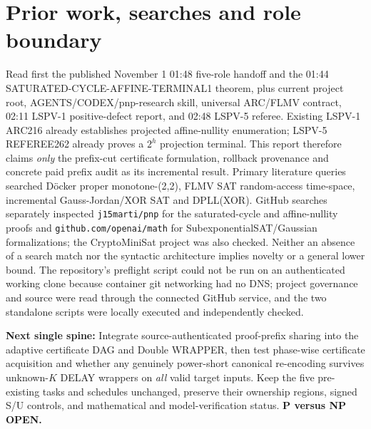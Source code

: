 \documentclass[11pt]{article}
\begin{document}
\section{Prior work, searches and role boundary}
Read first the published November 1 01:48 five-role handoff and the 01:44 SATURATED-CYCLE-AFFINE-TERMINAL1 theorem, plus current project root, AGENTS/CODEX/pnp-research skill, universal ARC/FLMV contract, 02:11 LSPV-1 positive-defect report, and 02:48 LSPV-5 referee. Existing LSPV-1 ARC216 already establishes projected affine-nullity enumeration; LSPV-5 REFEREE262 already proves a $2^h$ projection terminal. This report therefore claims \emph{only} the prefix-cut certificate formulation, rollback provenance and concrete paid prefix audit as its incremental result. Primary literature queries searched D\"ocker proper monotone-(2,2), FLMV SAT random-access time-space, incremental Gauss-Jordan/XOR SAT and DPLL(XOR). GitHub searches separately inspected \texttt{j15marti/pnp} for the saturated-cycle and affine-nullity proofs and \texttt{github.com/openai/math} for SubexponentialSAT/Gaussian formalizations; the CryptoMiniSat project was also checked. Neither an absence of a search match nor the syntactic architecture implies novelty or a general lower bound. The repository's preflight script could not be run on an authenticated working clone because container git networking had no DNS; project governance and source were read through the connected GitHub service, and the two standalone scripts were locally executed and independently checked.

\noindent\textbf{Next single spine:} Integrate source-authenticated proof-prefix sharing into the adaptive certificate DAG and Double WRAPPER, then test phase-wise certificate acquisition and whether any genuinely power-short canonical re-encoding survives unknown-$K$ DELAY wrappers on \emph{all} valid target inputs. Keep the five pre-existing tasks and schedules unchanged, preserve their ownership regions, signed S/U controls, and mathematical and model-verification status. \textbf{P versus NP OPEN.}


\end{document}
